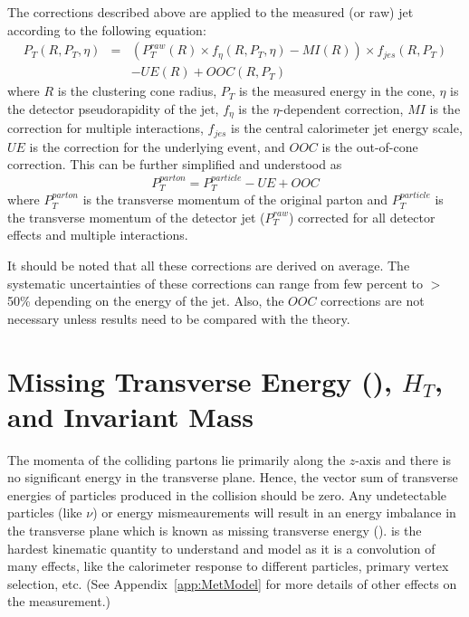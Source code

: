 The corrections described above are applied to the measured (or raw) jet according to the following equation:
\begin{eqnarray}\nonumber
 P_{T}(R,P_{T},\eta) &=& (P_{T}^{raw}(R)\times f_{\eta}(R,P_{T},\eta)-MI(R))\times f_{jes}(R,P_{T})\\
& & -UE(R)+OOC(R,P_{T})
\end{eqnarray}
\noindent where $R$ is the clustering cone radius, $P_{T}$ is the measured energy in the cone, $\eta$ is the detector pseudorapidity of the jet, $f_{\eta}$ is the $\eta$-dependent correction, $MI$ is the correction for multiple \ppbar interactions, $f_{jes}$ is the central calorimeter jet energy scale, $UE$ is the correction for the underlying event, and $OOC$ is the out-of-cone correction. This can be further simplified and understood as
\begin{equation}
 P_{T}^{parton} = P_{T}^{particle}-UE+OOC
\end{equation}
\noindent where $P_{T}^{parton}$ is the transverse momentum of the original parton and $P_{T}^{particle}$ is the transverse momentum of the detector jet ($P_{T}^{raw}$) corrected for all detector effects and multiple \ppbar interactions.

It should be noted that all these corrections are derived on average. The systematic uncertainties of these corrections can range from few percent to $>$50\% depending on the energy of the jet. Also, the $OOC$ corrections are not necessary unless results need to be compared with the theory.

\section{Missing Transverse Energy (\met), $H_{T}$, and Invariant Mass}\label{sec:MetReconstruction}
The momenta of the colliding partons lie primarily along the $z$-axis and there is no significant energy in the transverse plane. Hence, the vector sum of transverse energies of particles produced in the collision should be zero. Any undetectable particles (like $\nu$) or energy mismeaurements will result in an energy imbalance in the transverse plane which is known as missing transverse energy (\met). \met is the hardest kinematic quantity to understand and model as it is a convolution of many effects, like the calorimeter response to different particles, primary vertex selection, etc. (See Appendix~\ref{app:MetModel} for more details of other effects on the \met measurement.)

